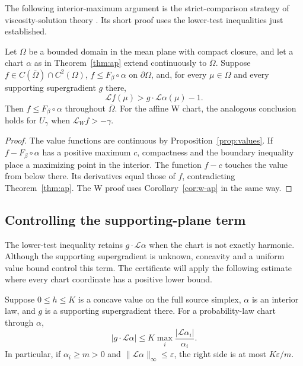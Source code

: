 The following interior-maximum argument is the strict-comparison
strategy of viscosity-solution theory
\cite[Section~5.C]{crandallishiilions1992}.  Its short proof uses the
lower-test inequalities just established.

\begin{corollary}\label{ap:comparison}
Let \(\Omega\) be a bounded domain in the mean plane with compact
closure, and let a chart \(\alpha\) as in Theorem~\ref{thm:ap} extend
continuously to \(\overline\Omega\).  Suppose
\(f\in C(\overline\Omega)\cap C^2(\Omega)\),
\(f\leq F_\beta\circ\alpha\) on \(\partial\Omega\), and, for every
\(\mu\in\Omega\) and every supporting supergradient \(g\) there,
\[
 \mathcal L f(\mu)>g\cdot\mathcal L\alpha(\mu)-1.
\]
Then \(f\leq F_\beta\circ\alpha\) throughout \(\overline\Omega\).
For the affine W chart, the analogous conclusion holds for \(U_\gamma\)
when \(\mathcal L_W f>-\gamma\).
\end{corollary}

\begin{proof}
The value functions are continuous by Proposition~\ref{prop:values}.
If \(f-F_\beta\circ\alpha\) has a positive maximum \(c\), compactness
and the boundary inequality place a maximizing point in the interior.
The function \(f-c\) touches the value from below there.  Its derivatives
equal those of \(f\), contradicting Theorem~\ref{thm:ap}.  The W proof
uses Corollary~\ref{cor:w-ap} in the same way.
\end{proof}

\subsection{Controlling the supporting-plane term}

The lower-test inequality retains \(g\cdot\mathcal L\alpha\) when the
chart is not exactly harmonic.  Although the supporting supergradient is
unknown, concavity and a uniform value bound control this term.  The
certificate will apply the following estimate where every chart coordinate
has a positive lower bound.

\begin{lemma}\label{ap:chart-error}
Suppose \(0\leq h\leq K\) is a concave value on the full source
simplex, \(\alpha\) is an interior law, and \(g\) is a supporting
supergradient there.  For a probability-law chart through \(\alpha\),
\[
 |g\cdot\mathcal L\alpha|
 \leq K\max_i\frac{|\mathcal L\alpha_i|}{\alpha_i}.
\]
In particular, if \(\alpha_i\geq m>0\) and
\(\|\mathcal L\alpha\|_\infty\leq\varepsilon\), the right side
is at most \(K\varepsilon/m\).
\end{lemma}

